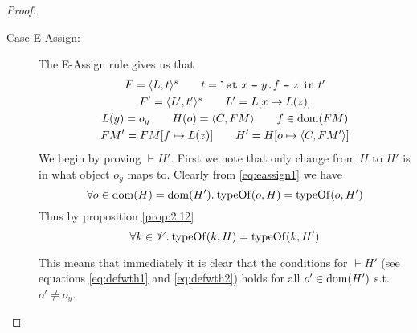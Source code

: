 \begin{proof}
\begin{description}
\begin{description}
\begin{description}
            \item[Case {\sc E-Assign}:] The {\sc E-Assign} rule gives us that
              \begin{equation} \label{eq:eassign1}
                \begin{gathered}
                  F = \mbox{$\langle L, t \rangle^s$} \quad\quad t = \mbox{\mdseries\texttt{let}~$x$~\texttt{=}~$\mbox{\mdseries$y$\texttt{.}$f$~\texttt{=}~$z$}$~\texttt{in}~$t'$} \\
                  F' = \mbox{$\langle L', t' \rangle^s$} \quad\quad L' = L[x \mapsto L(z)] \\
                  L(y) = o_y \quad\quad H(o) = \mbox{$\langle C, FM \rangle$} \quad\quad f \in \mbox{$\mathrm{dom}$}(FM)
                  \\
                  FM' = FM[f \mapsto L(z)] \quad\quad H' = H[o \mapsto \mbox{$\langle C, FM' \rangle$}]
                \end{gathered}
              \end{equation}
              We begin by proving $\vdash H'$. First we note
              that only change from $H$ to $H'$ is in what object $o_y$ maps to.
              Clearly from \eqref{eq:eassign1} we have
              \begin{equation} \label{eq:eassign2}
                \forall o \in \mbox{$\mathrm{dom}$}(H) = \mbox{$\mathrm{dom}$}(H'). \: \mbox{$\mathrm{typeOf}$}(o, H) = \mbox{$\mathrm{typeOf}$}(o,
                H')
              \end{equation}
              Thus by proposition \ref{prop:2.12} 
              \begin{equation} \label{eq:eassign3}
                \forall k \in \mathscr{V}. \: \mbox{$\mathrm{typeOf}$}(k, H) = \mbox{$\mathrm{typeOf}$}(k,
                H')
              \end{equation}
              \begin{addmargin}[1em]{1em}
                \begin{remark}
                  This means that immediately it is clear that the conditions
                  for $\vdash H'$ (see equations \eqref{eq:defwth1} and
                  \eqref{eq:defwth2}) holds for all $o' \in \mbox{$\mathrm{dom}$}(H')$ s.t. $o'
                  \neq o_y$.
                \end{remark}
              \end{addmargin}


\end{description}
\end{description}
\end{description}
\end{proof}
